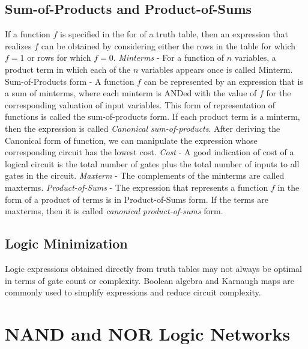 \documentclass[twocolumn]{article}
\begin{document}
\subsection{Sum-of-Products and Product-of-Sums}
If a function $f$ is specified in the for of a truth table, then an expression that realizes $f$ can be obtained by considering either the rows in the table for which $f=1$ or rows for which $f=0$.\newline\newline
\textit{Minterms} - For a function of $n$ variables, a product term in which each of the $n$ variables appears once is called Minterm.\newline\newline
Sum-of-Products form - A function $f$ can be represented by an expression that is a sum of minterms, where each minterm is ANDed with the value of $f$ for the corresponding valuation of input variables. This form of representation of functions is called the sum-of-products form. If each product term is a minterm, then the expression is called \textit{Canonical sum-of-products}. After deriving the Canonical form of function, we can manipulate the expression whose corresponding circuit has the lowest cost.\newline\newline
\textit{Cost} - A good indication of cost of a logical circuit is the total number of gates plus the total number of inputs to all gates in the circuit.\newline\newline
\textit{Maxterm} - The complements of the minterms are called maxterms.\newline\newline
\textit{Product-of-Sums} - The expression that represents a function $f$ in the form of a product of terms is in Product-of-Sums form. If the terms are maxterms, then it is called \textit{ canonical product-of-sums} form.\newline\newline

\subsection{Logic Minimization}
Logic expressions obtained directly from truth tables may not always be optimal in terms of gate count or complexity. Boolean algebra and Karnaugh maps are commonly used to simplify expressions and reduce circuit complexity.

\section{NAND and NOR Logic Networks}
\end{document}
